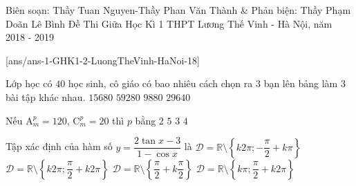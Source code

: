 
\begin{name}
	{Biên soạn: Thầy Tuan Nguyen-Thầy Phan Văn Thành \& Phản biện: Thầy Phạm Doãn Lê Bình}
	{Đề Thi Giữa Học Kì 1 THPT Lương Thế Vinh - Hà Nội, năm 2018 - 2019}
\end{name}


[ans/ans-1-GHK1-2-LuongTheVinh-HaNoi-18]
\begin{ex}%
	Lớp học có $40$ học sinh, cô giáo có bao nhiêu cách chọn ra $3$ bạn lên bảng làm $3$ bài tập khác nhau.
	\choice
	{$ 15680 $}
	{\True  $ 59280$}
	{$ 9880 $}
	{$ 29640$}
\end{ex}

\begin{ex}%
	Nếu $\mathrm{A}^p_m = 120$, $\mathrm{C}^p_m = 20$ thì $p$ bằng
	\choice
	{$2$}
	{$5$}
	{\True  $3$}
	{$4$}
\end{ex}

\begin{ex}%
	Tập xác định của hàm số $y = \dfrac{2\tan x - 3}{1 - \cos x}$ là
	\choice
	{\True $\mathscr{D} = \mathbb{R} \setminus \left\{k2\pi ; -\dfrac{\pi}{2} + k\pi \right\}$}
	{$\mathscr{D} = \mathbb{R} \setminus \left\{k2\pi ; \dfrac{\pi}{2} + k2\pi \right\}$}
	{$\mathscr{D} = \mathbb{R} \setminus \left\{\dfrac{\pi}{2} + k\dfrac{\pi}{2}\right\}$}
	{$\mathscr{D} = \mathbb{R} \setminus \left\{k\pi; \dfrac{\pi}{2} + k2\pi \right\}$}
\end{ex}

